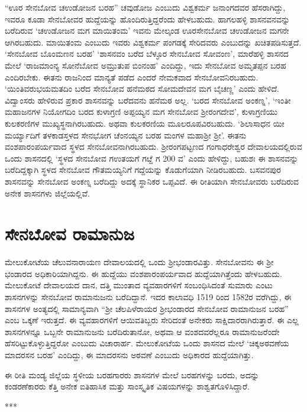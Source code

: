 “ಊರ ಸೇನಬೋವ ಚಉಡೋಜನ ಬರಹ” ಚವುಡೋಜ ಎಂಬುದು ವಿಶ್ವಕರ್ಮ ಜನಾಂಗದವರ ಹೆಸರಾಗಿದ್ದು, ಇವರೂ ಕೂಡಾ ಸೇನಬೋವರ ಹುದ್ದೆಯನ್ನು ಹೊಂದಿರುತ್ತಿದ್ದರೆಂದು ಹೇಳಬಹುದು. ಹಾಗಲಹಳ್ಳಿ ಶಾಸನವನವನ್ನು ಬರೆದಿರುವ ‘ಚಉಡೋಜನ ಮಗ ಮಾಯಿತಂಮ’ ಇವನು ಮೇಲ್ಕಂಡ ಊರಸೇನಬೋವ ಚಉಡೋಜನ ಮಗನೇ ಆಗಿರಬಹುದು. ಮಾಯಿತಂಮ ಎಂಬುದು ಇವರು ವಿಶ್ವಕರ್ಮ ಪಂಗಡಕ್ಕೆ ಸೇರಿದವರು ಎಂಬುದನ್ನು ಖಚಿತಪಡಿಸುತ್ತದೆ. ‘ಸೇನಬೋವ ಬೊಂಮಣನ ಬರಹ’ ‘ಶಾಸನವಂ ಬರೆದ ಬೆಳ್ಳೂರ ಸೇನಬೋವ ಸೋವಂಣ’, ಮಾರೆಹಳ್ಳಿ ಶಾಸನದ ಮೇಲೆ ‘ರಾಜಮಾಂನ್ಯ ಸೋನೆಬೋವ ಅಮ್ರುತುಪ ಬಿಂನಂಹ’ ಎಂದಿದ್ದು, ಇದು ಸೇನಬೋವ ಅಮೃತಪ್ಪನ ಬರಹ ಎಂದಿರಬೇಕು. ಈತನು ರಾಜನಿಂದ ಮಾನ್ಯತೆ ಪಡೆದ ಎಂದರೆ ನೇಮಕವಾದ ಸೇನಬೋವನಿರಬಹುದು. ‘ಯಿಂತಿವರುಭಯಮತದಿಂ ಬರೆದ ಸೇನಬೋವ ಹನೆಮಠದ ಸೋಮದೇವನ ಮಗ ಬೈಚಣ್ಣ’ ಎಂದು ಹೇಳಿದೆ. ವಿದ್ವಾಂಸರು ಹೇಳಿರುವ ಪ್ರಕಾರ ಶಾಸನವನ್ನು ಬರೆದವನು ಹನೆಮಠ ಅಲ್ಲ. ‘ಬರದ ಸೇನಬೋವ ಅಂಕಣ್ನ’, ‘ಇಂತೀ ಮಹಾಜನಗಳ ನಿಯೋಗದಿಂ ಬರದ ಕುಳಾಗ್ರಣಿ ಅಪ್ಪಯ್ಯನ ಮಗ ಸೇನಬೋವ ಶ‍್ರೀರಂಗದೇವ’, ಕುಳಾಗ್ರಣಿಯು ಕುಲಕರಣಿಗಳ ಮುಖ್ಯಸ್ಥನಾಗಿರಬಹುದು. ಅಥವಾ ಕುಲಕರಣಿಯ ಮೂಲರೂಪವಿರಬಹುದು. ‘ಶಿಲಾಸಾಧನ ಯೀ ಮರ್ಯ್ಯಾದಿಗೆ ತಳಕಾಡಸ್ತಳದ ಸೇನಭೋಗ ಚೆಂನಯ್ಯನ ಬರಹ ಮಂಗಳ ಮಹಾಶ‍್ರೀ ಶ‍್ರೀ’. ಈತನು ವಂಶಪಾರಂಪರ್ಯವಾದ ಸ್ಥಳದ ಸೇನಬೋವನಾಗಿರಬಹುದು. ಶ‍್ರೀರಂಗಪಟ್ಟಣದ ಗಂಗಾಧರೇಶ್ವರ ದೇವಾಲಯದಲ್ಲಿರುವ ಒಂದು ಶಾಸನದಲ್ಲಿ ‘ಸ್ಥಳದ ಸೇನಬೋವ ಗಉತಯಗೆ ಗೞ್ದೆ ಗ 200 ವ’ ಎಂದು ಹೇಳಿದ್ದು, ಬಹುಶಃ ಈ ಶಾಸನವನ್ನು ಬರೆದಿದ್ದಕ್ಕಾಗಿ ಸ್ಥಳದ ಸೇನಬೋವ ಗೌತಮಯ್ಯನಿಗೆ ಗದ್ದೆಯನ್ನು ಕೊಡುಗೆಯಾಗಿ ನೀಡಿರಬಹುದು. ಬಸವನಪುರ ಶಾಸನವನ್ನು ಸೇನಬೋವ ಅಂಕಣ್ನ ಬರೆದಿದ್ದು ಅದಕ್ಕೆ ಸ್ಥಾನಿಕರ ಒಪ್ಪವಿದೆ. ಈ ರೀತಿಯಾಗಿ ಸೇನಬೋವರು ಬರೆದಿರುವ ಅನೇಕ ಶಾಸನಗಳು ಜಿಲ್ಲೆಯಲ್ಲಿವೆ.


\section{ಸೇನಬೋವ ರಾಮಾನುಜ}

ಮೇಲುಕೋಟೆಯ ಚೆಲುವನಾರಾಯಣ ದೇವಾಲಯದಲ್ಲಿ ಒಂದು ಶ‍್ರೀಭಂಡಾರವಿತ್ತು. ಸೇನಬೋವನು ಈ ಶ‍್ರೀ ಭಂಡಾರದ ಅಧಿಕಾರಿಯಾಗಿದ್ದನು. ಈ ಹುದ್ದೆಯು ವಂಶಪಾರಂಪರ್ಯವಾದ ಹುದ್ದೆಯಾಗಿತ್ತೆಂದು ಹೇಳಬಹುದು. ಮೇಲುಕೋಟೆ ದೇವಾಲಯದ ದಾನ, ದತ್ತಿ ಮುಂತಾದ ವ್ಯವಹಾರಗಳಿಗೆ ಸಂಬಂಧಿಸಿದಂತೆ ಸುಮಾರು ಎಂಟು ಶಾಸನಗಳನ್ನು ಸೇನಬೋವ ರಾಮಾನುಜನು ಬರೆದಿದ್ದಾನೆ. ಇದರ ಕಾಲಾವಧಿ 1519 ರಿಂದ 1582ರ ವರೆಗಿದ್ದು, ಈ ಶಾಸನಗಳ ಅಂತ್ಯದಲ್ಲಿ ಸಾಮಾನ್ಯವಾಗಿ “ಶ‍್ರೀ ಚೆಲಪಿಳೆರಾಯರ ಶ‍್ರೀಭಂಡಾರದ ಸೇನಬೋವ ರಾಮಾನುಜನ ಬರಹ” ಎಂಬ ಒಕ್ಕಣೆ ಇರುತ್ತದೆ. ಈ ವ್ಯವಹಾರಗಳಿಗೆ ಆಯಿವತಿಬ್ಬರು ಸೇರಿದಂತೆ ಅನೇಕರು ಸಾಕ್ಷಿದಾರರಾಗಿರುತ್ತಾರೆ. ಈ ಎಲ್ಲ ಶಾಸನಗಳನ್ನೂ ಒಬ್ಬನೇ ರಾಮಾನುಜನು ಬರೆದಿರುತಾನೋ, ಅಥವಾ ಆ ವಂಶದವರೆಲ್ಲರೂ ರಾಮಾನುಜರೆಂದೇ ಹೆಸರಿಟ್ಟುಕೊಳ್ಳುತ್ತಿದ್ದರೋ ಎಂಬುದು ವಿಚಾರಾರ್ಹ. ಮೇಲುಕೋಟೆಯ ಒಂದು ಶಾಸನದ ಮೇಲೆ ‘ಚಿಕ್ಕಅಠವಣೆಯ ಮಾದರಸನ ಬರಹ’ ಎಂದಿದ್ದು, ಈ ಮಾದರಸನು ಅಠವಣೆ ಎಂಬುದು ಅಧಿಕಾರದ ಹುದ್ದೆಯಾಗಿತ್ತು.

ಈ ರೀತಿ ಮಂಡ್ಯ ಜಿಲ್ಲೆಯ ಸ್ಥಳೀಯ ಬರಹಗಾರರು ಶಾಸನಗಳ ಮೇಲೆ ಬರಹಗಳನ್ನು ಬರದು, ಅದನ್ನು ಕಂಡರಣೆಕಾರರು ಕೆತ್ತಿ ಅನೇಕ ಐತಿಹಾಸಿಕ ಮತ್ತು ಸಾಂಸ್ಕೃತಿಕ ವಿಷಯಗಳನ್ನು ಶಾಶ್ವತಗೊಳಿಸಿದ್ದಾರೆ.

\begin{center}
***
\end{center}

\theendnotes

